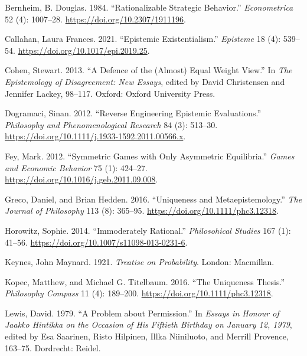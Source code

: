 \documentclass[
  11pt,
]{article}
\newlength{\cslhangindent}
\newenvironment{CSLReferences}[2] %
 {\begin{list}{}{%
  \setlength{\itemindent}{0pt}
  \setlength{\leftmargin}{0pt}
  \setlength{\parsep}{0pt}
  \ifodd #1
   \setlength{\leftmargin}{\cslhangindent}
   \setlength{\itemindent}{-1\cslhangindent}
  \fi
  \setlength{\itemsep}{#2\baselineskip}}}
 {\end{list}}
\begin{document}
\label{refs}
\begin{CSLReferences}{1}{0}
Bernheim, B. Douglas. 1984. {``Rationalizable Strategic Behavior.''} \emph{Econometrica} 52 (4): 1007--28. \url{https://doi.org/10.2307/1911196}.

Callahan, Laura Frances. 2021. {``Epistemic Existentialism.''} \emph{Episteme} 18 (4): 539--54. \url{https://doi.org/10.1017/epi.2019.25}.

Cohen, Stewart. 2013. {``A Defence of the (Almost) Equal Weight View.''} In \emph{The Epistemology of Disagreement: New Essays}, edited by David Christensen and Jennifer Lackey, 98--117. Oxford: Oxford University Press.

Dogramaci, Sinan. 2012. {``Reverse Engineering Epistemic Evaluations.''} \emph{Philosophy and Phenomenological Research} 84 (3): 513--30. \url{https://doi.org/10.1111/j.1933-1592.2011.00566.x}.

Fey, Mark. 2012. {``Symmetric Games with Only Asymmetric Equilibria.''} \emph{Games and Economic Behavior} 75 (1): 424--27. \url{https://doi.org/10.1016/j.geb.2011.09.008}.

Greco, Daniel, and Brian Hedden. 2016. {``Uniqueness and Metaepistemology.''} \emph{The Journal of Philosophy} 113 (8): 365--95. \url{https://doi.org/10.1111/phc3.12318}.

Horowitz, Sophie. 2014. {``Immoderately Rational.''} \emph{Philosohical Studies} 167 (1): 41--56. \url{https://doi.org/10.1007/s11098-013-0231-6}.

Keynes, John Maynard. 1921. \emph{Treatise on Probability}. London: Macmillan.

Kopec, Matthew, and Michael G. Titelbaum. 2016. {``The Uniqueness Thesis.''} \emph{Philosophy Compass} 11 (4): 189--200. \url{https://doi.org/10.1111/phc3.12318}.

Lewis, David. 1979. {``A Problem about Permission.''} In \emph{Essays in Honour of {J}aakko Hintikka on the Occasion of His Fiftieth Birthday on {J}anuary 12, 1979}, edited by Esa Saarinen, Risto Hilpinen, Illka Niiniluoto, and Merrill Provence, 163--75. Dordrecht: Reidel.


\end{CSLReferences}
\end{document}
